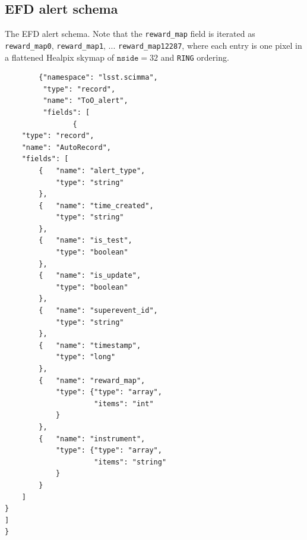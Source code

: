 \subsection{EFD alert schema}

The EFD alert schema. Note that the \texttt{reward\_map} field is iterated as \texttt{reward\_map0}, \texttt{reward\_map1}, ... \texttt{reward\_map12287}, where each entry is one pixel in a flattened Healpix skymap of $\texttt{nside}=32$ and \texttt{RING} ordering.

\begin{lstlisting}
        {"namespace": "lsst.scimma",
         "type": "record",
         "name": "ToO_alert",
         "fields": [
                {
    "type": "record",
    "name": "AutoRecord",
    "fields": [
        {   "name": "alert_type",
            "type": "string"
        },
        {   "name": "time_created",
            "type": "string"
        },
        {   "name": "is_test",
            "type": "boolean"
        },
        {   "name": "is_update",
            "type": "boolean"
        },
        {   "name": "superevent_id",
            "type": "string"
        },
        {   "name": "timestamp",
            "type": "long"
        },
        {   "name": "reward_map",
            "type": {"type": "array",
                     "items": "int"
            }
        },
        {   "name": "instrument",
            "type": {"type": "array",
                     "items": "string"
            }
        }
    ]
}
]
}
\end{lstlisting}